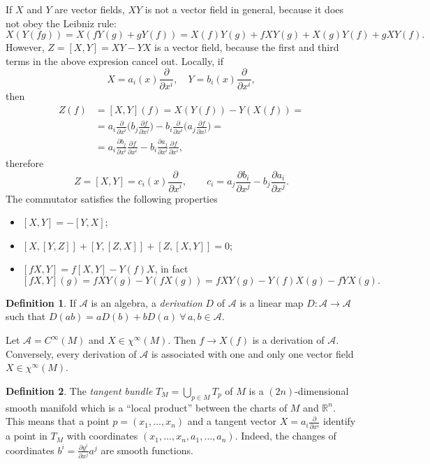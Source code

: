 \documentclass[a4paper,12pt]{book}
\theoremstyle{definition}
\newtheorem{definition}{Definition}
\theoremstyle{remark}
\begin{document}
If $X$ and $Y$ are vector fields, $XY$ is not a vector field in general, because it does not obey the Leibniz rule:
\[X(Y(fg))=X(fY(g)+gY(f))=X(f)Y(g)+fXY(g)+X(g)Y(f)+gXY(f).\]
However, $Z=[X,Y]=XY-YX$ is a vector field, because the first and third terms in the above expresion cancel out. Locally, if
\[X=a_i(x)\frac{\partial}{\partial x^i},\quad Y=b_i(x)\frac{\partial}{\partial x^i},\]
then
\[\begin{split}
Z(f)&=[X,Y](f)=X(Y(f))-Y(X(f))=\\
&=a_i\frac{\partial}{\partial x^i}\biggl(b_j\frac{\partial f}{\partial x^j}\biggr)-b_i\frac{\partial}{\partial x^i}\biggl(a_j\frac{\partial f}{\partial x^j}\biggr)=\\
&=a_i\frac{\partial b_j}{\partial x^i}\frac{\partial f}{\partial x^i}-b_i\frac{\partial a_j}{\partial x^i}\frac{\partial f}{\partial x^i},
\end{split}\]
therefore
\[Z=[X,Y]=c_i(x)\frac{\partial}{\partial x^i},\qquad c_i=a_j\frac{\partial b_i}{\partial x^j}-b_j\frac{\partial a_i}{\partial x^j}.\]
The commutator satisfies the following properties
\begin{itemize}
\item $[X,Y]=-[Y,X]$;
\item $[X,[Y,Z]]+[Y,[Z,X]]+[Z,[X,Y]]=0$;
\item $[fX,Y]=f[X,Y]-Y(f)X$, in fact
\[[fX,Y](g)=fXY(g)-Y(fX(g))=fXY(g)-Y(f)X(g)-fYX(g).\]
\end{itemize}
\begin{definition}
If $\mathcal A$ is an algebra, a \emph{derivation} $D$ of $\mathcal A$ is a linear map $D\colon \mathcal A\to \mathcal A$ such that $D(ab)=aD(b)+bD(a)\ \forall\,a,b\in\mathcal A$.
\end{definition}

Let $\mathcal A=C^\infty(M)$ and $X\in\chi^\infty(M)$. Then $f\to X(f)$ is a derivation of $\mathcal A$. Conversely, every derivation of $\mathcal A$ is associated with one and only one vector field $X\in\chi^\infty(M)$.

\begin{definition}
The \emph{tangent bundle} $T_M=\bigcup_{p\in M}T_p$ of $M$ is a $(2n)$-dimensional smooth manifold which is a ``local product'' between the charts of $M$ and $\mathbb R^n$. This means that a point $p=(x_1,\ldots,x_n)$ and a tangent vector $X=a_i\frac{\partial}{\partial x^i}$ identify a point in $T_M$ with coordinates $(x_1,\ldots,x_n,a_1,\ldots,a_n)$. Indeed, the changes of coordinates $b^i=\frac{\partial y^i}{\partial x^j}a^j$ are smooth functions.
\end{definition}
\end{document}
